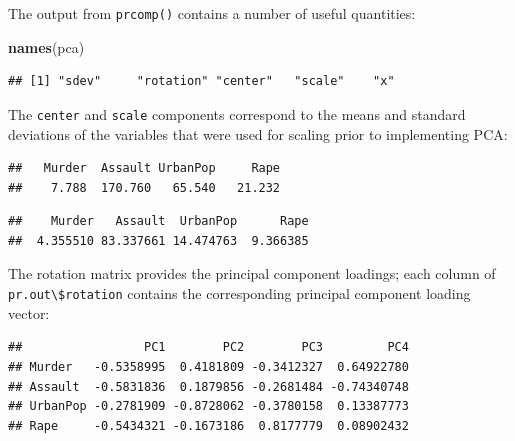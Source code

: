 \documentclass[
  openany]{book}
\newenvironment{Shaded}{\begin{snugshade}}{\end{snugshade}}
\newcommand{\KeywordTok}[1]{\textcolor[rgb]{0.13,0.29,0.53}{\textbf{#1}}}
\newcommand{\NormalTok}[1]{#1}
\newcommand{\OperatorTok}[1]{\textcolor[rgb]{0.81,0.36,0.00}{\textbf{#1}}}
\begin{document}
The output from \texttt{prcomp()} contains a number of useful quantities:

\begin{Shaded}
\begin{Highlighting}[]
\KeywordTok{names}\NormalTok{(pca)}
\end{Highlighting}
\end{Shaded}

\begin{verbatim}
## [1] "sdev"     "rotation" "center"   "scale"    "x"
\end{verbatim}

The \texttt{center} and \texttt{scale} components correspond to the means and standard
deviations of the variables that were used for scaling prior to implementing
PCA:

\begin{Shaded}
\end{Shaded}

\begin{verbatim}
##   Murder  Assault UrbanPop     Rape 
##    7.788  170.760   65.540   21.232
\end{verbatim}

\begin{Shaded}
\end{Shaded}

\begin{verbatim}
##    Murder   Assault  UrbanPop      Rape 
##  4.355510 83.337661 14.474763  9.366385
\end{verbatim}

The rotation matrix provides the principal component loadings; each column
of \texttt{pr.out\textbackslash{}\$rotation} contains the corresponding principal component
loading vector:

\begin{Shaded}
\end{Shaded}

\begin{verbatim}
##                 PC1        PC2        PC3         PC4
## Murder   -0.5358995  0.4181809 -0.3412327  0.64922780
## Assault  -0.5831836  0.1879856 -0.2681484 -0.74340748
## UrbanPop -0.2781909 -0.8728062 -0.3780158  0.13387773
## Rape     -0.5434321 -0.1673186  0.8177779  0.08902432
\end{verbatim}
\end{document}
